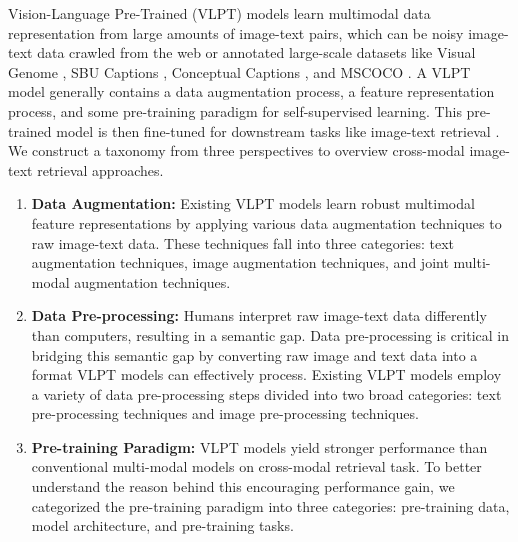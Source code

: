 Vision-Language Pre-Trained (VLPT) models learn multimodal data representation from large amounts of image-text pairs, which can be noisy image-text data crawled from the web or annotated large-scale datasets like Visual Genome \cite{krishna2016visual}, SBU Captions \cite{im2text}, Conceptual Captions \cite{conceptualcaptions}, and MSCOCO \cite{Lin2014MicrosoftCC}. A VLPT model generally contains a data augmentation process, a feature representation process, and some pre-training paradigm for self-supervised learning. This pre-trained model is then fine-tuned for downstream tasks like image-text retrieval \cite{flickr8k}. We construct a taxonomy from three perspectives to overview cross-modal image-text retrieval approaches. 

\begin{enumerate}
    \item \textbf{Data Augmentation:} Existing VLPT models learn robust multimodal feature representations by applying various data augmentation techniques to raw image-text data. These techniques fall into three categories: text augmentation techniques, image augmentation techniques, and joint multi-modal augmentation techniques. 
    
    \item \textbf{Data Pre-processing:} Humans interpret raw image-text data differently than computers, resulting in a semantic gap. Data pre-processing is critical in bridging this semantic gap by converting raw image and text data into a format VLPT models can effectively process. Existing VLPT models employ a variety of data pre-processing steps divided into two broad categories: text pre-processing techniques and image pre-processing techniques. 

    \item \textbf{Pre-training Paradigm:} VLPT models yield stronger performance than conventional multi-modal models on cross-modal retrieval task. To better understand the reason behind this encouraging performance gain, we categorized the pre-training paradigm into three categories: pre-training data, model architecture, and pre-training tasks. 
\end{enumerate}

